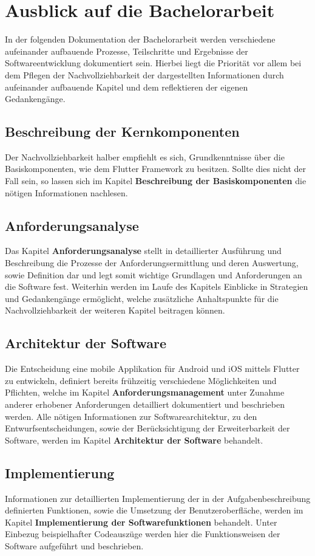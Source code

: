 \documentclass{scrreprt}
\begin{document}
\section{Ausblick auf die Bachelorarbeit}
In der folgenden Dokumentation der Bachelorarbeit werden verschiedene aufeinander aufbauende Prozesse, Teilschritte und Ergebnisse der Softwareentwicklung dokumentiert sein. Hierbei liegt die Priorität vor allem bei dem Pflegen der Nachvollziehbarkeit der dargestellten Informationen durch aufeinander aufbauende Kapitel und dem reflektieren der eigenen Gedankengänge.
\subsection{Beschreibung der Kernkomponenten}
Der Nachvollziehbarkeit halber empfiehlt es sich, Grundkenntnisse über die Basiskomponenten, wie dem Flutter Framework zu besitzen. Sollte dies nicht der Fall sein, so lassen sich im Kapitel \textbf{Beschreibung der Basiskomponenten} die nötigen Informationen nachlesen.
\subsection{Anforderungsanalyse}
Das Kapitel \textbf{Anforderungsanalyse} stellt in detaillierter Ausführung und Beschreibung die Prozesse der Anforderungsermittlung und deren Auswertung, sowie Definition dar und legt somit wichtige Grundlagen und Anforderungen an die Software fest. Weiterhin werden im Laufe des Kapitels Einblicke in Strategien und Gedankengänge ermöglicht, welche zusätzliche Anhaltspunkte für die Nachvollziehbarkeit der weiteren Kapitel beitragen können.
\subsection{Architektur der Software}
Die Entscheidung eine mobile Applikation für Android und iOS mittels Flutter zu entwickeln, definiert bereits frühzeitig verschiedene Möglichkeiten und Pflichten, welche im Kapitel \textbf{Anforderungsmanagement} unter Zunahme anderer erhobener Anforderungen detailliert dokumentiert und beschrieben werden.
Alle nötigen Informationen zur Softwarearchitektur, zu den Entwurfsentscheidungen, sowie der Berücksichtigung der Erweiterbarkeit der Software, werden im Kapitel \textbf{Architektur der Software} behandelt.
\subsection{Implementierung}
Informationen zur detaillierten Implementierung der in der Aufgabenbeschreibung definierten Funktionen, sowie die Umsetzung der Benutzeroberfläche, werden im Kapitel \textbf{Implementierung der Softwarefunktionen} behandelt. Unter Einbezug beispielhafter Codeauszüge werden hier die Funktionsweisen der Software aufgeführt und beschrieben.
\end{document}
